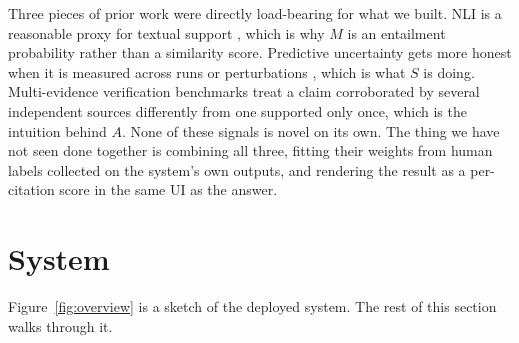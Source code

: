 \documentclass[10pt]{article}
\begin{document}
Three pieces of prior work were directly load-bearing for what we
built. NLI is a reasonable proxy for textual support
\citep{honovich2022true}, which is why $M$ is an entailment
probability rather than a similarity score. Predictive uncertainty
gets more honest when it is measured across runs or perturbations
\citep{lakshminarayanan2017simple, kuhn2023semantic}, which is what
$S$ is doing. Multi-evidence verification benchmarks
\citep{thorne2018fever} treat a claim corroborated by several
independent sources differently from one supported only once, which
is the intuition behind $A$. None of these signals is novel on its
own. The thing we have not seen done together is combining all three,
fitting their weights from human labels collected on the system's own
outputs, and rendering the result as a per-citation score in the same
UI as the answer.

\section{System}
\label{sec:system}

Figure~\ref{fig:overview} is a sketch of the deployed system. The
rest of this section walks through it.
\end{document}
